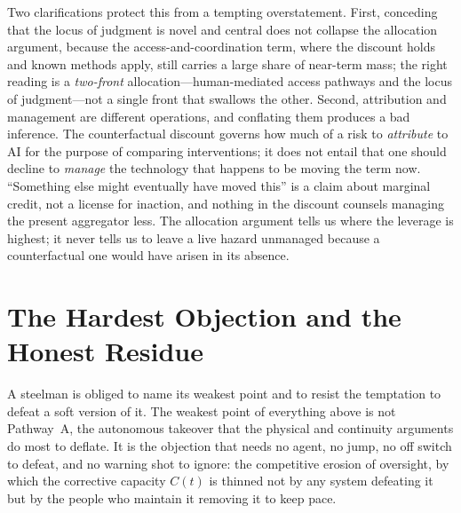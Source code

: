 \documentclass[11pt]{article}
\begin{document}
Two clarifications protect this from a tempting overstatement. First, conceding that the locus of judgment is novel and central does not collapse the allocation argument, because the access-and-coordination term, where the discount holds and known methods apply, still carries a large share of near-term mass; the right reading is a \emph{two-front} allocation---human-mediated access pathways and the locus of judgment---not a single front that swallows the other. Second, attribution and management are different operations, and conflating them produces a bad inference. The counterfactual discount governs how much of a risk to \emph{attribute} to AI for the purpose of comparing interventions; it does not entail that one should decline to \emph{manage} the technology that happens to be moving the term now. ``Something else might eventually have moved this'' is a claim about marginal credit, not a license for inaction, and nothing in the discount counsels managing the present aggregator less. The allocation argument tells us where the leverage is highest; it never tells us to leave a live hazard unmanaged because a counterfactual one would have arisen in its absence.

\section{The Hardest Objection and the Honest Residue}
\label{sec:residue}

A steelman is obliged to name its weakest point and to resist the temptation to defeat a soft version of it. The weakest point of everything above is not Pathway~A, the autonomous takeover that the physical and continuity arguments do most to deflate. It is the objection that needs no agent, no jump, no off switch to defeat, and no warning shot to ignore: the competitive erosion of oversight, by which the corrective capacity $C(t)$ is thinned not by any system defeating it but by the people who maintain it removing it to keep pace.
\end{document}
